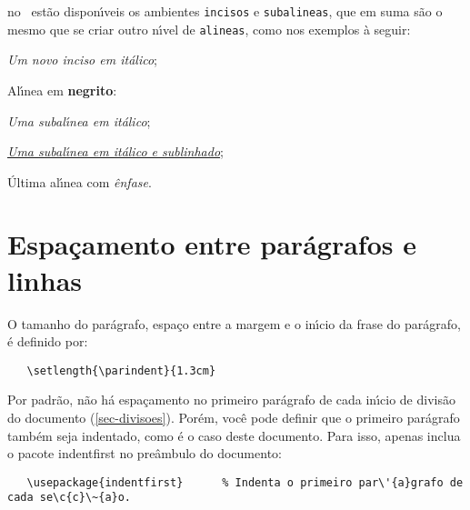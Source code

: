 \begin{alineas}
  \item no \abnTeX\ est\~{a}o dispon\'{\i}veis os ambientes \texttt{incisos} e
  \texttt{subalineas}, que em suma s\~{a}o o mesmo que se criar outro n\'{\i}vel de
  \texttt{alineas}, como nos exemplos \`{a} seguir:

  \begin{incisos}
    \item \textit{Um novo inciso em it\'{a}lico};
  \end{incisos}

  \item Al\'{\i}nea em \textbf{negrito}:

  \begin{subalineas}
    \item \textit{Uma subal\'{\i}nea em it\'{a}lico};
    \item \underline{\textit{Uma subal\'{\i}nea em it\'{a}lico e sublinhado}};
  \end{subalineas}

  \item \'{U}ltima al\'{\i}nea com \emph{\^{e}nfase}.

\end{alineas}

\section{Espa\c{c}amento entre par\'{a}grafos e linhas}

O tamanho do par\'{a}grafo, espa\c{c}o entre a margem
e o in\'{\i}cio da frase do par\'{a}grafo, \'{e} definido por:

\begin{verbatim}
   \setlength{\parindent}{1.3cm}
\end{verbatim}

Por padr\~{a}o, n\~{a}o h\'{a} espa\c{c}amento no
primeiro par\'{a}grafo de cada in\'{\i}cio de divis\~{a}o do documento
(\autoref{sec-divisoes}). Por\'{e}m, voc\^{e} pode definir que o primeiro par\'{a}grafo
tamb\'{e}m seja indentado, como \'{e} o caso deste documento. Para isso, apenas inclua o
pacote \textsf{indentfirst} no pre\^{a}mbulo do documento:

\begin{verbatim}
   \usepackage{indentfirst}      % Indenta o primeiro par\'{a}grafo de cada se\c{c}\~{a}o.
\end{verbatim}

